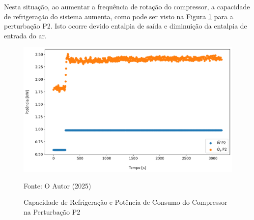 Nesta situação, ao aumentar a frequência de rotação do compressor, a capacidade de refrigeração do sistema aumenta, como pode ser visto na Figura \ref{fig:Capacidade de Resfriamento e Potência de Consumo do Compressor P2} para a perturbação P2. Isto ocorre devido entalpia de saída e diminuição da entalpia de entrada do ar.
\newpage
\begin{figure}[h]
    \centering
    \includegraphics[width=1\linewidth]{FigurasdoTexto/Qe e W Perturbação Rot.png}
    \caption{Capacidade de Refrigeração e Potência de Consumo do Compressor na Perturbação P2}
    \label{fig:Capacidade de Resfriamento e Potência de Consumo do Compressor P2}
    {\footnotesize Fonte: O Autor (2025)}
\end{figure}

